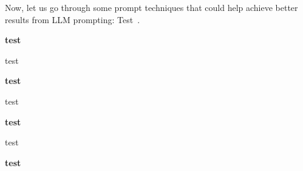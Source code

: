 \begin{refsegment}
Now, let us go through some prompt techniques that could help achieve better results from LLM prompting:
Test~\cite{PromptingTechniques}.

\textbf{test}

test

\textbf{test}

test

\textbf{test}

test

\textbf{test}









\end{refsegment}
